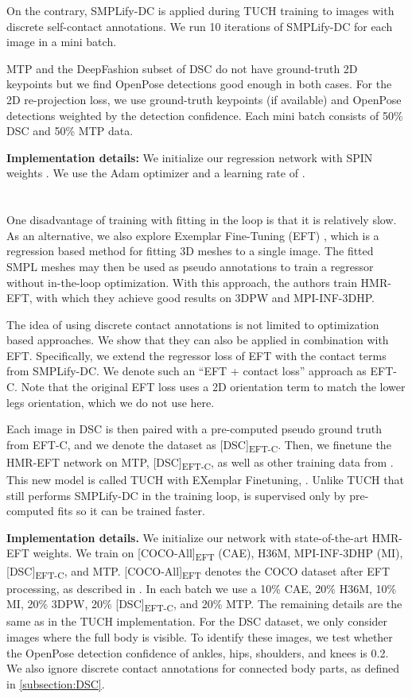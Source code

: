 \documentclass[final]{cvpr}
\newcommand{\smplifyxdc}{\mbox{SMPLify-DC}\xspace}
\theoremstyle{definition}
\begin{document}
On the contrary, \smplifyxdc is applied during TUCH training to images with discrete self-contact annotations. 
We run 10 iterations of \smplifyxdc for each image in a mini batch. 

MTP and the DeepFashion subset of DSC do not have ground-truth 2D keypoints but we find OpenPose detections good enough in both cases. 
For the 2D re-projection loss, we use ground-truth keypoints (if available) and OpenPose detections weighted by the detection confidence. Each mini batch consists of 50\% DSC and 50\% MTP data. 

\textbf{Implementation details:} We initialize our regression
network with SPIN weights \cite{kolotouros2019learning}. We use the Adam optimizer \cite{kingma2014adam} and a learning rate of . 

\section{}

One disadvantage of training with fitting in the loop is that it is relatively slow. 
As an alternative, we also explore Exemplar Fine-Tuning (EFT) \cite{joo2020eft}, which is a regression based method for fitting 3D meshes to a single image. 
The fitted SMPL meshes may then be used as pseudo annotations to train a regressor without in-the-loop optimization. 
With this approach, the authors train HMR-EFT, with which they achieve good results on 3DPW and MPI-INF-3DHP.

The idea of using discrete contact annotations is not limited to optimization based approaches. We show that they can also be applied in combination with EFT. Specifically, we extend the regressor loss of EFT with the contact terms from \smplifyxdc. We denote such an ``EFT + contact loss'' approach as EFT-C. Note that the original EFT loss uses a 2D orientation term to match the lower legs orientation, which we do not use here.

Each image in DSC is then paired with a pre-computed pseudo ground truth from EFT-C, and we denote the dataset as [DSC]\textsubscript{EFT-C}. 
Then, we finetune the HMR-EFT network on MTP, [DSC]\textsubscript{EFT-C}, as well as other training data from \cite{joo2020eft}. This new model is called TUCH with EXemplar Finetuning, . 
Unlike TUCH that still performs \smplifyxdc in the training loop,  is supervised only by pre-computed fits so it can be trained faster.

\textbf{Implementation details.} We initialize our network with state-of-the-art HMR-EFT weights. We train  on [COCO-All]\textsubscript{EFT} (CAE), H36M, MPI-INF-3DHP (MI), [DSC]\textsubscript{EFT-C}, and MTP. [COCO-All]\textsubscript{EFT} denotes the COCO dataset after EFT processing, as described in \cite{joo2020eft}. In each batch we use a 10\% CAE, 20\% H36M, 10\% MI, 20\% 3DPW, 20\% [DSC]\textsubscript{EFT-C}, and 20\% MTP. The remaining details are the same as in the TUCH implementation. For the DSC dataset, we only consider images where the full body is visible. To identify these images, we test whether the OpenPose detection confidence of ankles, hips, shoulders, and knees is  0.2. We also ignore discrete contact annotations for connected body parts, as defined in \ref{subsection:DSC}.
\end{document}
